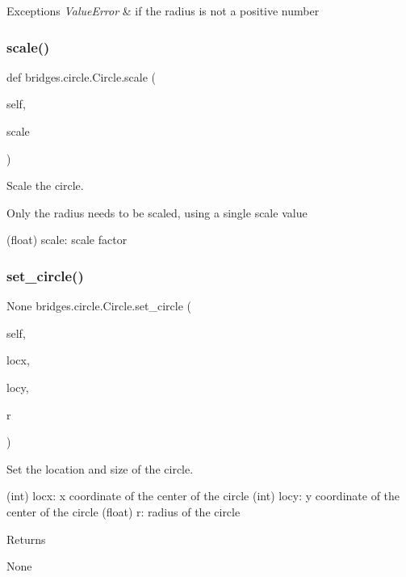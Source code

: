 \begin{DoxyExceptions}{Exceptions}
{\em Value\+Error} & if the radius is not a positive number \\
\hline
\end{DoxyExceptions}
\mbox{\label{classbridges_1_1circle_1_1_circle_a92c1f6b354aed8cb29a52c92ffb3bbbc}} 
\subsubsection{\texorpdfstring{scale()}{scale()}}
{\footnotesize\ttfamily def bridges.\+circle.\+Circle.\+scale (\begin{DoxyParamCaption}\item[{}]{self,  }\item[{float}]{scale }\end{DoxyParamCaption})}



Scale the circle. 

Only the radius needs to be scaled, using a single scale value \begin{DoxyVerb}       (float) scale: scale factor
\end{DoxyVerb}
 \mbox{\label{classbridges_1_1circle_1_1_circle_a7144baba783d925fec886c1a27511be1}} 
\subsubsection{\texorpdfstring{set\_circle()}{set\_circle()}}
{\footnotesize\ttfamily  None bridges.\+circle.\+Circle.\+set\+\_\+circle (\begin{DoxyParamCaption}\item[{}]{self,  }\item[{}]{locx,  }\item[{}]{locy,  }\item[{}]{r }\end{DoxyParamCaption})}



Set the location and size of the circle. 

\begin{DoxyVerb}       (int) locx: x coordinate of the center of the circle
       (int) locy: y coordinate of the center of the circle
       (float) r: radius of the circle
\end{DoxyVerb}
 \begin{DoxyReturn}{Returns}


None
\end{DoxyReturn}

